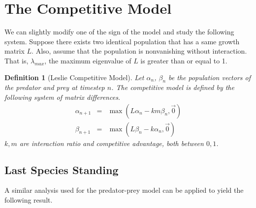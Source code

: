 \documentclass[11pt,reqno]{amsart}
\numberwithin{equation}{section}
\theoremstyle{plain}
\newtheorem{definition}[thm]{Definition}
\begin{document}
\section{The Competitive Model}
We can slightly modify one of the sign of the model and 
study the following system. Suppose there exists two identical 
population that has a same growth matrix $L$. Also, assume 
that the population is nonvanishing without interaction. That is, 
$\lambda_{max}$, the maximum eigenvalue of $L$ is greater 
than or equal to 1. 
\begin{definition}[Leslie Competitive Model]
Let $\alpha_n$, $\beta_n$ be the population vectors 
of the predator and prey at timestep $n$. The competitive 
model is defined by the following 
system of matrix differences. 
\begin{eqnarray}\label{eqn:conditions}
    \alpha_{n + 1} &=& \max(L \alpha_n - k m \beta_n, \vec 0) \\ 
    \beta_{n + 1} &=& \max(L \beta_n - k \alpha_n, \vec 0) \nonumber
\end{eqnarray}
$k, m$ are interaction ratio and competitive advantage, both between $0, 1$. 
\end{definition}



\subsection{Last Species Standing}\label{sec:lastSpecies}

A similar analysis used for the predator-prey model 
can be applied to yield the following result. 
\end{document}
